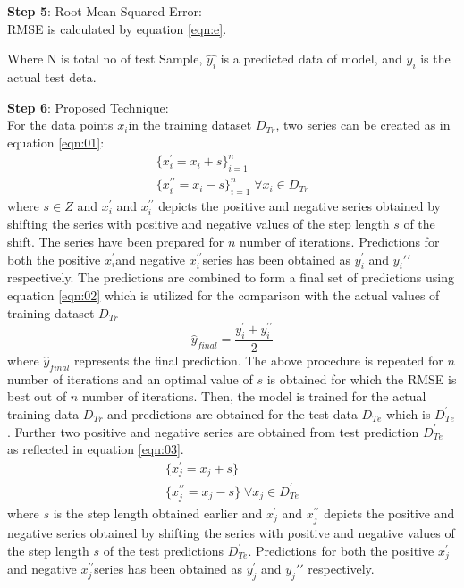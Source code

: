 \documentclass[sn-mathphys,Numbered]{sn-jnl}
\theoremstyle{thmstyleone}
\theoremstyle{thmstyletwo}
\theoremstyle{thmstylethree}
\begin{document}
\par {\textbf{Step 5}: Root Mean Squared Error:}\\ RMSE is calculated by equation \ref{eqn:e}.



Where N is total no of test Sample, \(\hat{y_{i}}\) is a predicted data of model, and \(y_{i}\) is the actual test deta.\\
\par {\textbf{Step 6}: Proposed Technique:} \\
For the data points $x_i$in the training dataset $D_{Tr}$, two series can be created as in equation \ref{eqn:01}:
\begin{equation}
\begin{aligned}
\label{eqn:01}
\{x_i^{\prime}=x_i+s\}_{i=1}^n \\
\{x_i^{\prime\prime}=x_i-s\}_{i=1}^n \; \forall x_i \in D_{Tr}
\end{aligned}
\end{equation}
where $s \in Z$ and $x_i^{\prime}$ and $x_{i}^{\prime\prime}$ depicts the positive and negative series obtained by shifting the series with positive and negative values of the step length $s$ of the shift. The series have been prepared for $n$ number of iterations.
Predictions for both the positive $x_i^{\prime}$and negative $x_i^{\prime\prime}$series has been obtained as $y_i^{\prime}$ and $y_i{\prime\prime}$ respectively.
The predictions are combined to form a final set of predictions using equation \ref{eqn:02} which is utilized for the comparison with the actual values of training dataset $D_{Tr}$
\begin{equation}
\label{eqn:02}
\hat{y}_{final}=\frac{y_i^{\prime}+y_i^{\prime\prime}}{2}
\end{equation}
where $\hat{y}_{final}$ represents the final prediction. The above procedure is repeated for $n$ number of iterations and an optimal value of $s$ is obtained for which the RMSE is best out of $n$ number of iterations. 
Then, the model is trained for the actual training data $D_{Tr}$ and predictions are obtained for the test data $D_{Te}$ which is $D_{Te}^{\prime}$. Further two positive and negative series are obtained from test prediction $D_{Te}^{\prime}$ as reflected in equation \ref{eqn:03}.
\begin{equation}
\begin{aligned}
\label{eqn:03}
\{x_j^{\prime}=x_j+s\} \\
\{x_j^{\prime\prime}=x_j-s\} \; \forall x_j \in D_{Te}^{\prime}
\end{aligned}
\end{equation}
where $s$ is the step length obtained earlier and $x_j^{\prime}$ and $x_{j}^{\prime\prime}$ depicts the positive and negative series obtained by shifting the series with positive and negative values of the step length $s$ of the test predictions $ D_{Te}^{\prime}$.
Predictions for both the positive $x_j^{\prime}$and negative $x_j^{\prime\prime}$series has been obtained as $y_j^{\prime}$ and $y_j{\prime\prime}$ respectively.
\end{document}
